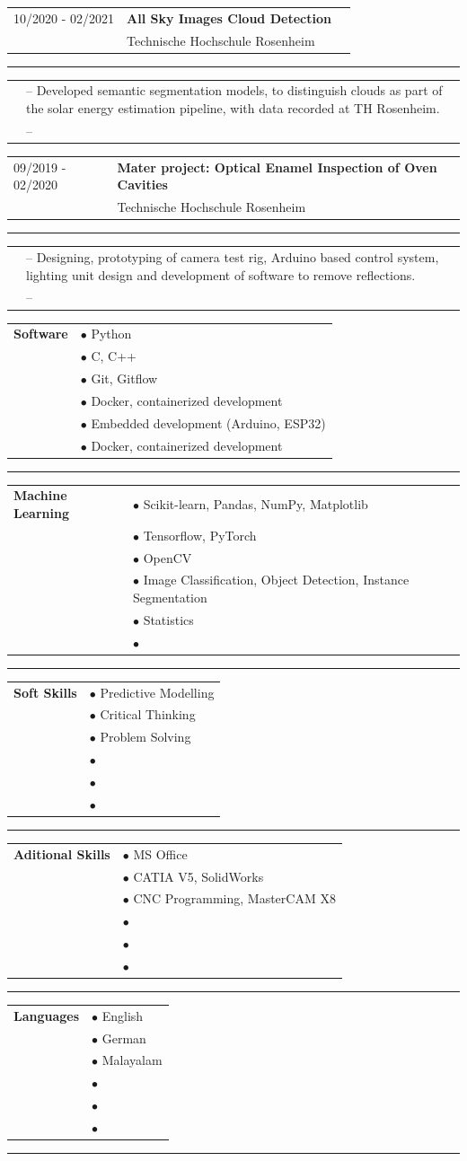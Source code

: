 \documentclass[10pt,A4]{article}
\newcommand{\cvsection}[1]{
\vspace{8pt}
\colorbox{sectcol}{
\mystrut \makebox[1\linewidth][l]{
	\textcolor{white}{\textbf{#1}}\hspace{4pt}
	}
	}
}
\newcommand{\cvevent}[5]
{
\vspace{8pt}
\begin{tabular*}{1\textwidth}{p{3.3cm}  p{9.8cm} x{3.9cm}}
	\textcolor{bgcol}{#1} 	& \textbf{#2} \\ 
	 						& \textcolor{sectcol}{#3} \\
\end{tabular*}

\textcolor{softcol}{\hrule}

\vspace{6pt}
\begin{tabular*}{1\textwidth}{p{3.3cm} p{13.4cm}}
	&	\textcolor{bgcol}{--}  #4\\[3pt]
	&	\textcolor{bgcol}{--}  #5\\[6pt]
\end{tabular*}
}
\newcommand{\cvskill}[7]
{
\vspace{8pt}
\begin{tabular*}{1\textwidth}{p{3.3cm} p{13.4cm}}
	\textbf{#1} 		&	\textcolor{bgcol}{$\bullet$ }  #2\\[3pt]
						&	\textcolor{bgcol}{$\bullet$ }  #3\\[3pt]
						&	\textcolor{bgcol}{$\bullet$ }  #4\\[3pt]
						&	\textcolor{bgcol}{$\bullet$ }  #5\\[3pt]
						&	\textcolor{bgcol}{$\bullet$ }  #6\\[3pt]
						&	\textcolor{bgcol}{$\bullet$ }  #7\\[3pt]
\end{tabular*}
\textcolor{softcol}{\hrule}
}
\newcommand{\mystrut}{\rule[-.3\baselineskip]{0pt}{\baselineskip}}
\begin{document}
\cvsection{Projects}

\cvevent{10/2020 - 02/2021}
{All Sky Images Cloud Detection}
{Technische Hochschule Rosenheim}
{Developed semantic segmentation models, to distinguish clouds as part of 
the solar energy estimation pipeline, with data recorded at TH Rosenheim.}
{}

\cvevent{09/2019 - 02/2020}
{Mater project: Optical Enamel Inspection of Oven Cavities}
{Technische Hochschule Rosenheim}
{Designing, prototyping of camera test rig, Arduino based control system, 
lighting unit design and development of software to remove reflections.}
{}


\cvsection{Skills}

\cvskill{Software}
{Python}
{C, C++}
{Git, Gitflow}
{Docker, containerized development}
{Embedded development (Arduino, ESP32)}
{Docker, containerized development}

\cvskill{Machine Learning}
{Scikit-learn, Pandas, NumPy, Matplotlib}
{Tensorflow, PyTorch}
{OpenCV}
{Image Classification, Object Detection, Instance Segmentation}
{Statistics}
{}

\cvskill{Soft Skills}
{Predictive Modelling}
{Critical Thinking}
{Problem Solving}
{}
{}
{}

\cvskill{Aditional Skills}
{MS Office}
{CATIA V5, SolidWorks}
{CNC Programming, MasterCAM X8}
{}
{}
{}

\cvskill{Languages}
{English}
{German}
{Malayalam}
{}
{}
{}


\null
\vspace*{\fill}

\end{document}
